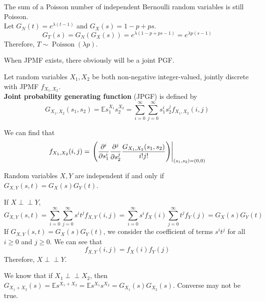 \documentclass{huhtakm-template-book}
\newcommand{\independent}{\perp\!\!\!\perp}
\newcommand{\expect}{\mathbb{E}}
\DeclareMathOperator{\Poisson}{Poisson}
\begin{document}
\begin{eg}
	The sum of a Poisson number of independent Bernoulli random variables is still Poisson.\\
	Let $G_{N}(t)=e^{\lambda(t-1)}$ and $G_{X}(s)=1-p+ps$.
	\begin{equation*}
		G_{T}(s)=G_{N}(G_{X}(s))=e^{\lambda(1-p+ps-1)}=e^{\lambda p(s-1)}
	\end{equation*}
	Therefore, $T\sim\Poisson(\lambda p)$.
\end{eg}
When JPMF exists, there obviously will be a joint PGF.
\begin{defn}
	Let random variables $X_{1},X_{2}$ be both non-negative integer-valued, jointly discrete with JPMF $f_{X_{1},X_{2}}$.\\
	\textbf{Joint probability generating function} (JPGF) is defined by
	\begin{equation*}
		G_{X_{1},X_{2}}(s_{1},s_{2})=\expect s_{1}^{X_{1}}s_{2}^{X_{2}}=\sum_{i=0}^{\infty}\sum_{j=0}^{\infty}s_{1}^{i}s_{2}^{j}f_{X_{1},X_{2}}(i,j)
	\end{equation*}
\end{defn}
\begin{rem}
	We can find that
	\begin{equation*}
		f_{X_{1},X_{2}}(i,j)=\left.\left(\pdv*[order={i}]{\pdv*[order={j}]{\frac{G_{X_{1},X_{2}}(s_{1},s_{2})}{i!j!}}{s_{2}}}{s_{1}}\right)\right|_{(s_{1},s_{2})=(0,0)}
	\end{equation*}
\end{rem}
\begin{thm}
	Random variables $X,Y$ are independent if and only if $G_{X,Y}(s,t)=G_{X}(s)G_{Y}(t)$.
\end{thm}
\begin{proofing}
	If $X\independent Y$,
	\begin{equation*}
		G_{X,Y}(s,t)=\sum_{i=0}^{\infty}\sum_{j=0}^{\infty}s^{i}t^{j}f_{X,Y}(i,j)=\sum_{i=0}^{\infty}s^{i}f_{X}(i)\sum_{j=0}^{\infty}t^{j}f_{Y}(j)=G_{X}(s)G_{Y}(t)
	\end{equation*}
	If $G_{X,Y}(s,t)=G_{X}(s)G_{Y}(t)$, we consider the coefficient of terms $s^{i}t^{j}$ for all $i\geq 0$ and $j\geq 0$. We can see that
	\begin{equation*}
		f_{X,Y}(i,j)=f_{X}(i)f_{Y}(j)
	\end{equation*}
	Therefore, $X\independent Y$.
\end{proofing}
\begin{rem}
	We know that if $X_{1}\independent X_{2}$, then $G_{X_{1}+X_{2}}(s)=\expect s^{X_{1}+X_{2}}=\expect s^{X_{1}}s^{X_{2}}=G_{X_{1}}(s)G_{X_{2}}(s)$. Converse may not be true.
\end{rem}
\end{document}

